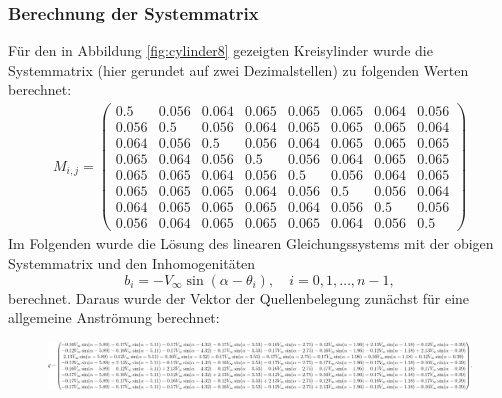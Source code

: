 \subsubsection{Berechnung der Systemmatrix}
Für den in Abbildung \ref{fig:cylinder8} gezeigten Kreisylinder wurde die Systemmatrix (hier gerundet auf zwei Dezimalstellen) zu folgenden Werten berechnet:
\begin{align*}
M_{i,j} = 
\begin{pmatrix}
0.5&0.056&0.064&0.065&0.065&0.065&0.064&0.056 \\
0.056&0.5&0.056&0.064&0.065&0.065&0.065&0.064\\
0.064&0.056&0.5&0.056&0.064&0.065&0.065&0.065\\
0.065&0.064&0.056&0.5&0.056&0.064&0.065&0.065\\
0.065&0.065&0.064&0.056&0.5&0.056&0.064&0.065\\
0.065&0.065&0.065&0.064&0.056&0.5&0.056&0.064\\
0.064&0.065&0.065&0.065&0.064&0.056&0.5&0.056\\
0.056&0.064&0.065&0.065&0.065&0.064&0.056&0.5
\end{pmatrix}
\end{align*}
Im Folgenden wurde die Lösung des linearen Gleichungssystems mit der obigen Systemmatrix und den Inhomogenitäten
\begin{equation}
b_i =  -V_{\infty} \sin{(\alpha -\theta _i)}, \quad i= 0,1,\ldots, n-1,
\end{equation}
berechnet. Daraus wurde der Vektor der Quellenbelegung zunächst für eine allgemeine Anströmung berechnet: \\
\begin{figure}[!h]
\begin{center}
\includegraphics[scale=0.2]{figures/analytical.png} 
\label{fig:analyticalcylinder8}
\end{center}
\end{figure}

